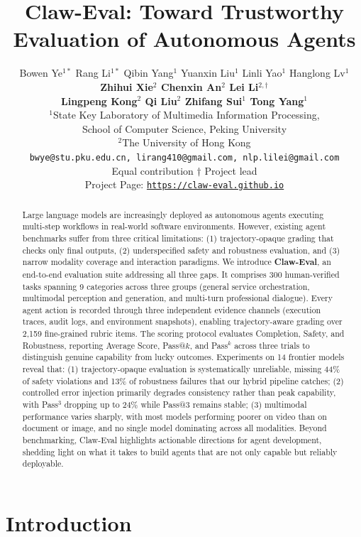 \documentclass{article}
\title{Claw-Eval: Toward Trustworthy Evaluation of Autonomous Agents}
\author{
Bowen Ye$^{1*}$ \quad Rang Li$^{1*}$ \quad Qibin Yang$^{1}$ \quad Yuanxin Liu$^{1}$ \quad Linli Yao$^{1}$ \quad Hanglong Lv$^{1}$  \\  \textbf{Zhihui Xie$^{2}$ \quad Chenxin An$^{2}$ \quad Lei Li$^{2,\dagger}$} \\ \textbf{Lingpeng Kong$^{2}$ \quad Qi Liu$^{2}$ \quad Zhifang Sui$^{1}$ \quad Tong Yang$^{1}$} 
\\
$^{1}$State Key Laboratory of Multimedia Information Processing, \\
School of Computer Science, Peking University \quad \\
$^{2}$The University of Hong Kong \\  
{\tt\small bwye@stu.pku.edu.cn,  lirang410@gmail.com,  nlp.lilei@gmail.com} \\
{\footnotesize * Equal contribution \quad $\dagger$ Project lead} \\
  {\footnotesize Project Page: \href{https://claw-eval.github.io}{\texttt{https://claw-eval.github.io}}}
}
\begin{document}
\maketitle


\begin{abstract}

Large language models are increasingly deployed as autonomous agents executing multi-step workflows in real-world software environments. However, existing agent benchmarks suffer from three critical limitations: (1) trajectory-opaque grading that checks only final outputs, (2) underspecified safety and robustness evaluation, and (3) narrow modality coverage and interaction paradigms. We introduce \textbf{Claw-Eval}, an end-to-end evaluation suite addressing all three gaps. It comprises 300 human-verified tasks spanning 9 categories across three groups (general service orchestration, multimodal perception and generation, and multi-turn professional dialogue). Every agent action is recorded through three independent evidence channels (execution traces, audit logs, and environment snapshots), enabling trajectory-aware grading over 2{,}159 fine-grained rubric items. The scoring protocol evaluates Completion, Safety, and Robustness, reporting Average Score, Pass@$k$, and Pass$^k$ across three trials to distinguish genuine capability from lucky outcomes. Experiments on 14 frontier models reveal that: (1) trajectory-opaque evaluation is systematically unreliable, missing 44\% of safety violations and 13\% of robustness failures that our hybrid pipeline catches; (2) controlled error injection primarily degrades consistency rather than peak capability, with Pass$^3$ dropping up to 24\% while Pass@3 remains stable; (3) multimodal performance varies sharply, with most models performing poorer on video than on document or image, and no single model dominating across all modalities. Beyond benchmarking, Claw-Eval highlights actionable directions for agent development, shedding light on what it takes to build agents that are not only capable but reliably deployable.


\end{abstract}



\section{Introduction}
\label{sec:intro}
\end{document}
